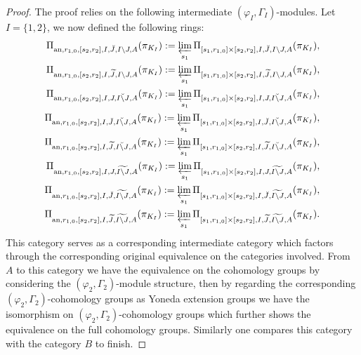 \documentclass[12pt]{amsart}
\theoremstyle{definition}
\numberwithin{equation}{section}
\begin{document}
\begin{proof}
The proof relies on the following intermediate $(\varphi_I,\Gamma_I)$-modules. Let $I=\{1,2\}$, we now defined the following rings:
\begin{align}
\Pi_{\mathrm{an},r_{1,0},[s_2,r_2],I,\breve{J},I\backslash J,A}(\pi_{K_I}):=\varprojlim_{s_1}\Pi_{[s_1,r_{1,0}]\times[s_2,r_{2}],I,\breve{J},I\backslash J,A}(\pi_{K_I}),\\	
\Pi_{\mathrm{an},r_{1,0},[s_2,r_2],I,\widetilde{J},I\backslash J,A}(\pi_{K_I}):=\varprojlim_{s_1} \Pi_{[s_1,r_{1,0}]\times[s_2,r_{2}],I,\widetilde{J},I\backslash J,A}(\pi_{K_I}),\\
\Pi_{\mathrm{an},r_{1,0},[s_2,r_2],I,J,\breve{I\backslash J},A}(\pi_{K_I}):=\varprojlim_{s_1}\Pi_{[s_1,r_{1,0}]\times[s_2,r_{2}],I,J,\breve{I\backslash J},A}(\pi_{K_I}),\\	
\Pi_{\mathrm{an},r_{1,0},[s_2,r_2],I,\breve{J},\breve{I\backslash J},A}(\pi_{K_I}):=\varprojlim_{s_1} \Pi_{[s_1,r_{1,0}]\times[s_2,r_{2}],I,\breve{J},\breve{I\backslash J},A}(\pi_{K_I}),\\	
\Pi_{\mathrm{an},r_{1,0},[s_2,r_2],I,\widetilde{J},\breve{I\backslash J},A}(\pi_{K_I}):=\varprojlim_{s_1} \Pi_{[s_1,r_{1,0}]\times[s_2,r_{2}],I,\widetilde{J},\breve{I\backslash J},A}(\pi_{K_I}),\\
\Pi_{\mathrm{an},r_{1,0},[s_2,r_2],I,J,\widetilde{I\backslash J},A}(\pi_{K_I}):=\varprojlim_{s_1} \Pi_{[s_1,r_{1,0}]\times[s_2,r_{2}],I,J,\widetilde{I\backslash J},A}(\pi_{K_I}),\\	
\Pi_{\mathrm{an},r_{1,0},[s_2,r_2],I,\breve{J},\widetilde{I\backslash J},A}(\pi_{K_I}):=\varprojlim_{s_1} \Pi_{[s_1,r_{1,0}]\times[s_2,r_{2}],I,\breve{J},\widetilde{I\backslash J},A}(\pi_{K_I}),\\	
\Pi_{\mathrm{an},r_{1,0},[s_2,r_2],I,\widetilde{J},\widetilde{I\backslash J},A}(\pi_{K_I}):=\varprojlim_{s_1} \Pi_{[s_1,r_{1,0}]\times[s_2,r_{2}],I,\widetilde{J},\widetilde{I\backslash J},A}(\pi_{K_I}).	
\end{align}
This category serves as a corresponding intermediate category which factors through the corresponding original equivalence on the categories involved. From $A$ to this category we have the equivalence on the cohomology groups by considering the $(\varphi_2,\Gamma_2)$-module structure, then by regarding the corresponding $(\varphi_2,\Gamma_2)$-cohomology groups as Yoneda extension groups we have the isomorphism on $(\varphi_2,\Gamma_2)$-cohomology groups which further shows the equivalence on the full cohomology groups. Similarly one compares this category with the category $B$ to finish.




	
\end{proof}
\end{document}
